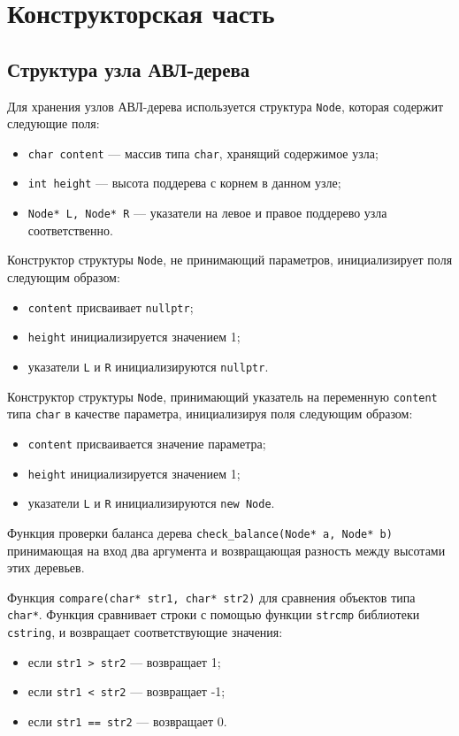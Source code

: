 \chapter{Конструкторская часть}

\section{Структура узла АВЛ-дерева}
Для хранения узлов АВЛ-дерева используется структура \texttt{Node}, которая содержит следующие поля:
\begin{itemize}
	\item \texttt{char content} --- массив типа \texttt{char}, хранящий содержимое узла;
	\item \texttt{int height} --- высота поддерева с корнем в данном узле;
	\item \texttt{Node* L, Node* R} --- указатели на левое и правое поддерево узла соответственно.
\end{itemize}

Конструктор структуры \texttt{Node}, не принимающий параметров, инициализирует поля следующим образом:
\begin{itemize}
	\item \texttt{content} присваивает \texttt{nullptr};
	\item \texttt{height} инициализируется значением 1;
	\item указатели \texttt{L} и \texttt{R} инициализируются \texttt{nullptr}.
\end{itemize}

Конструктор структуры \texttt{Node}, принимающий указатель на переменную \texttt{content} типа \texttt{char} в качестве параметра, инициализируя поля следующим образом:
\begin{itemize}
	\item \texttt{content} присваивается значение параметра;
	\item \texttt{height} инициализируется значением 1;
	\item указатели \texttt{L} и \texttt{R} инициализируются \texttt{new Node}.
\end{itemize}

Функция проверки баланса дерева \texttt{check\_balance(Node* a, Node* b)} принимающая на вход два аргумента и возвращающая разность между высотами этих деревьев.\par
Функция \texttt{compare(char* str1, char* str2)} для сравнения объектов типа \texttt{char*}. Функция сравнивает строки с помощью функции \texttt{strcmp} библиотеки \texttt{cstring}, и возвращает соответствующие значения:
\begin{itemize}
	\item если \texttt{str1 > str2} --- возвращает 1;
	\item если \texttt{str1 < str2} --- возвращает -1;
	\item если \texttt{str1 == str2} --- возвращает 0.
\end{itemize}


